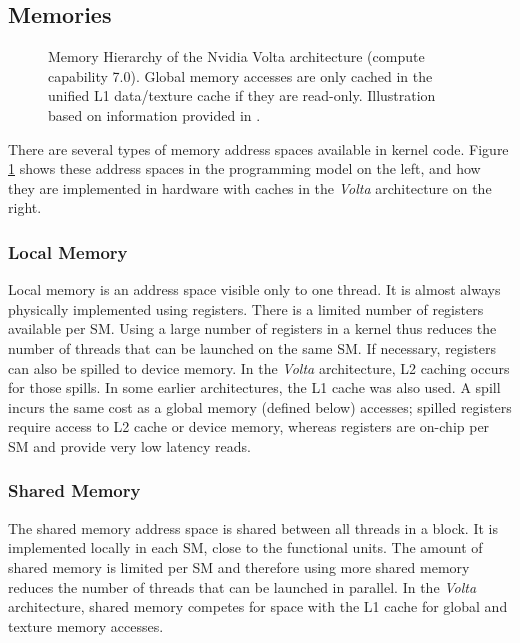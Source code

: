 \subsection{Memories} \label{sec:memories}

\begin{figure}
    \makebox[\textwidth][c]{
    }
    \caption{\label{fig:memory-hierarchy} Memory Hierarchy of the Nvidia Volta architecture (compute capability 7.0). Global memory accesses are only cached in the unified L1 data/texture cache if they are read-only. Illustration based on information provided in \cite[Sections 2.3, 5.3.2, H.6]{cuda-programming}.}
\end{figure}

There are several types of memory address spaces available in kernel code. Figure \ref{fig:memory-hierarchy} shows these address spaces in the programming model on the left, and how they are implemented in hardware with caches in the \emph{Volta} architecture on the right. 

\subsubsection{Local Memory}
Local memory is an address space visible only to one thread. It is almost always physically implemented using registers. There is a limited number of registers available per SM. Using a large number of registers in a kernel thus reduces the number of threads that can be launched on the same SM. If necessary, registers can also be spilled to device memory. In the \emph{Volta} architecture, L2 caching occurs for those spills. In some earlier architectures, the L1 cache was also used. A spill incurs the same cost as a global memory (defined below) accesses; spilled registers require access to L2 cache or device memory, whereas registers are on-chip per SM and provide very low latency reads.

\subsubsection{Shared Memory}
The shared memory address space is shared between all threads in a block. It is implemented locally in each SM, close to the functional units. The amount of shared memory is limited per SM and therefore using more shared memory reduces the number of threads that can be launched in parallel. In the \emph{Volta} architecture, shared memory competes for space with the L1 cache for global and texture memory accesses.

